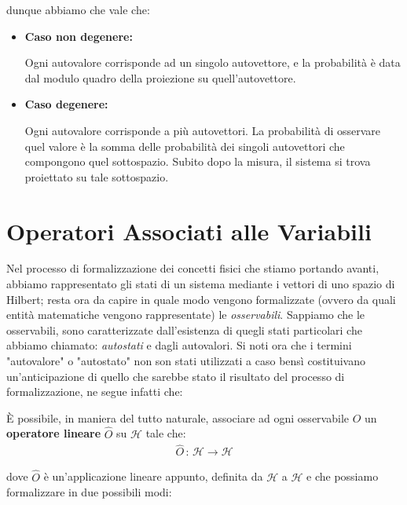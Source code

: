 	dunque abbiamo che vale che:
	
\begin{itemize}
	\item \textbf{Caso non degenere:}
	
		Ogni autovalore corrisponde ad un singolo autovettore, e la probabilità è data dal modulo quadro della proiezione su quell'autovettore.
	
	\item \textbf{Caso degenere:}
	
		Ogni autovalore corrisponde a più autovettori. La probabilità di osservare quel valore è la somma delle probabilità dei singoli autovettori che compongono quel sottospazio. Subito dopo la misura, il sistema si trova proiettato su tale sottospazio.
\end{itemize}
			
\section{Operatori Associati alle Variabili}

	Nel processo di formalizzazione dei concetti fisici che stiamo portando avanti, abbiamo rappresentato gli stati di un sistema mediante i vettori di uno spazio di Hilbert; resta ora da capire in quale modo vengono formalizzate (ovvero da quali entità matematiche vengono rappresentate) le \textit{osservabili}. Sappiamo che le osservabili, sono caratterizzate dall'esistenza di quegli stati particolari che abbiamo chiamato: \textit{autostati} e dagli autovalori. Si noti ora che i termini "autovalore" o "autostato" non son stati utilizzati a caso bensì costituivano un'anticipazione di quello che sarebbe stato il risultato del processo di formalizzazione, ne segue infatti che:

\begin{mypost}
	È possibile, in maniera del tutto naturale, associare ad ogni osservabile $O$ un \textbf{operatore lineare} $\hat{O}$ su $\mathcal{H}$ tale che:
\begin{align*}
	\hat{O} \, : \, \mathcal{H} \to \mathcal{H}
\end{align*}
\end{mypost}

	dove $\hat{O}$ è un'applicazione lineare appunto, definita da $\mathcal{H}$ a $\mathcal{H}$ e che possiamo formalizzare in due possibili modi:
	
